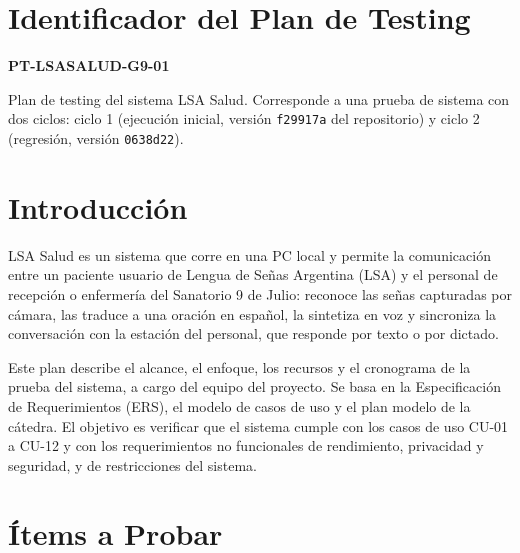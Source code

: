\documentclass[12pt, a4paper]{article}
\newcommand{\idPlan}{PT-LSASALUD-G9-01}
\begin{document}


\tableofcontents
\newpage

\section{Identificador del Plan de Testing}

\begin{center}
    \Large\textbf{\idPlan}
\end{center}

Plan de testing del sistema LSA Salud. Corresponde a una prueba de sistema con
dos ciclos: ciclo 1 (ejecución inicial, versión \texttt{f29917a} del
repositorio) y ciclo 2 (regresión, versión \texttt{0638d22}).

\section{Introducción}

LSA Salud es un sistema que corre en una PC local y permite la comunicación
entre un paciente usuario de Lengua de Señas Argentina (LSA) y el personal de
recepción o enfermería del Sanatorio 9 de Julio: reconoce las señas capturadas
por cámara, las traduce a una oración en español, la sintetiza en voz y
sincroniza la conversación con la estación del personal, que responde por
texto o por dictado.

Este plan describe el alcance, el enfoque, los recursos y el cronograma de la
prueba del sistema, a cargo del equipo del proyecto. Se basa en la
Especificación de Requerimientos (ERS), el modelo de casos de uso y el plan
modelo de la cátedra. El objetivo es verificar que el sistema cumple con los
casos de uso CU-01 a CU-12 y con los requerimientos no funcionales de
rendimiento, privacidad y seguridad, y de restricciones del sistema.

\section{Ítems a Probar}
\end{document}
